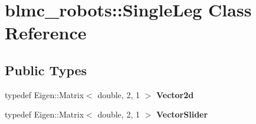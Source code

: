 \hypertarget{classblmc__robots_1_1SingleLeg}{}\section{blmc\+\_\+robots\+:\+:Single\+Leg Class Reference}
\label{classblmc__robots_1_1SingleLeg}
\subsection*{Public Types}
\begin{DoxyCompactItemize}
\item 
typedef Eigen\+::\+Matrix$<$ double, 2, 1 $>$ {\bfseries Vector2d}\hypertarget{classblmc__robots_1_1SingleLeg_a37fdbf57313957a5773cb13f2ad7190c}{}\label{classblmc__robots_1_1SingleLeg_a37fdbf57313957a5773cb13f2ad7190c}

\item 
typedef Eigen\+::\+Matrix$<$ double, 2, 1 $>$ {\bfseries Vector\+Slider}\hypertarget{classblmc__robots_1_1SingleLeg_a926cd2dfc01483687d44259874450757}{}\label{classblmc__robots_1_1SingleLeg_a926cd2dfc01483687d44259874450757}

\end{DoxyCompactItemize}
